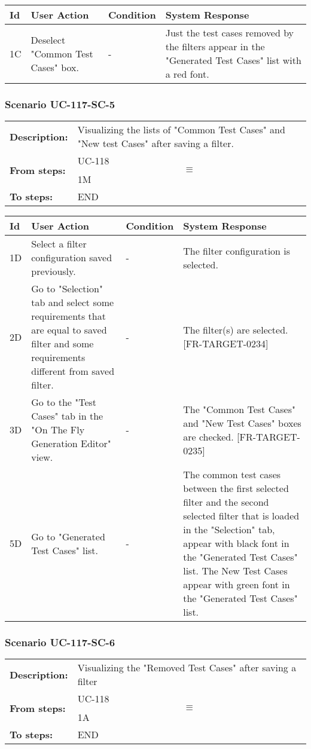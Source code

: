 \documentclass[a4paper,11pt]{article}
\newcommand{\bl}{\\ \hline}
\begin{document}
\begin{tabular}{|p{0.8in}|p{1.6in}|p{1.6in}|p{1.6in}|}
\hline
Id & User Action & Condition & System Response  \bl 
1C & Deselect "Common Test Cases" box. & - & Just the test cases removed by the filters appear in the "Generated Test Cases" list with a red font. \bl 
\end{tabular}
\subsubsection*{Scenario UC-117-SC-5}
\begin{tabular}{p{1in}p{4in}}
{\bf Description:} & Visualizing the lists of "Common Test Cases" and "New test Cases" after saving a filter. \\
{\bf From steps:} & UC-118$$\equiv$$1M \\
{\bf To steps:} & END \\
\end{tabular}
 
\begin{tabular}{|p{0.8in}|p{1.6in}|p{1.6in}|p{1.6in}|}
\hline
Id & User Action & Condition & System Response  \bl 
1D & Select a filter configuration saved previously. & - & The filter configuration is selected. \bl 
2D & Go to "Selection" tab and select some requirements that are equal to saved filter and some requirements different from saved filter. & - & The filter(s) are selected. [FR-TARGET-0234] \bl 
3D & Go to the "Test Cases" tab in the "On The Fly Generation Editor" view. & - & The "Common Test Cases" and "New Test Cases" boxes are checked. [FR-TARGET-0235] \bl 
5D & Go to "Generated Test Cases" list. & - & The common test cases between the first selected filter and the second selected filter that is loaded in the "Selection" tab, appear with black font in the "Generated Test Cases" list. The New Test Cases appear with green font in the "Generated Test Cases" list. \bl 
\end{tabular}
\subsubsection*{Scenario UC-117-SC-6}
\begin{tabular}{p{1in}p{4in}}
{\bf Description:} & Visualizing the "Removed Test Cases" after saving a filter \\
{\bf From steps:} & UC-118$$\equiv$$1A \\
{\bf To steps:} & END \\
\end{tabular}
 
\end{document}
